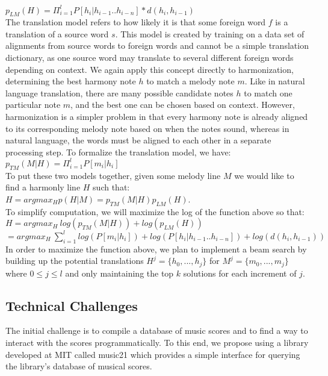 \documentclass{sig-alternate}
\begin{document}
$p_{LM}(H) = \Pi_{i = 1}^{l} P[h_{i} | h_{i - 1} .. h_{i - n}] * d(h_{i}, h_{i-1})$\\

The translation model refers to how likely it is that some foreign word $f$ is
a translation of a source word $s$. This model is created by training on a data set of alignments from source words to foreign words and cannot be a simple translation dictionary, as one source word may translate to several different foreign words depending on
context. We again apply this concept directly to harmonization, determining the best harmony note $h$ to match a melody note $m$. Like in natural language translation, there are many possible candidate notes $h$ to match one particular note $m$, and the best one can be chosen based on context. However, harmonization is a simpler problem in that every harmony note is already aligned to its corresponding melody note based on when the notes sound, whereas in natural language, the words must be aligned to each other in a separate processing step. To formalize the translation model, we have:\\

$p_{TM}(M | H) = \Pi_{i = 1}^{l} P[m_{i} | h_{i}]$\\

To put these two models together, given some melody line $M$ we would like to find a harmonly line $H$ such that:\\

$H = argmax_{H}p(H | M) = p_{TM}(M | H)p_{LM}(H)$.\\

To simplify computation, we will maximize the log of the function above so that:\\

$H = argmax_{H}\ log(p_{TM}(M | H)) + log(p_{LM}(H))$\\

$= argmax_{H}\ \sum_{i = 1}^{l} log(P[m_{i} | h_{i}]) + log(P[h_{i} | h_{i - 1} .. h_{i - n}]) + log(d(h_{i}, h_{i-1}))$\\

In order to maximize the function above, we plan to implement a beam search by building up the potential translations $H^{j} = \{h_{0}, ... , h_{j}\}$ for $M^{j} = \{m_{0}, ... , m_{j}\}$ where $0 \leq j \leq l$ and only maintaining the top $k$ solutions for each increment of $j$.\\

\subsection{Technical Challenges}
\label{subsec:tech_challenges}
The initial challenge is to compile a database of music scores and to find a way to interact with
the scores programmatically. To this end, we propose using a library developed at MIT called music21 \cite{Cuthbert_music21:a}
which provides a simple interface for querying the library's database of musical scores.
\end{document}
